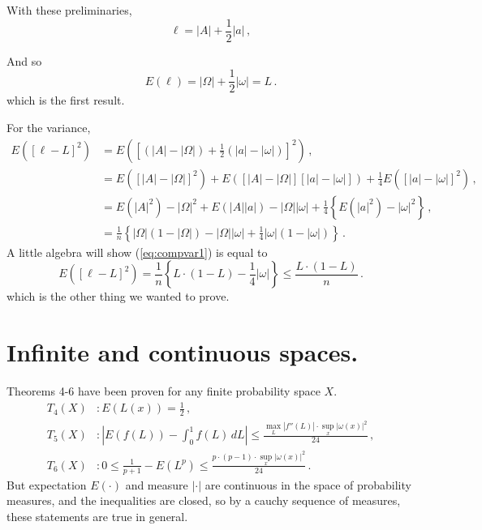 With these preliminaries,
\begin{equation}
\ell = |A| + \frac{1}{2} |a| \,,
\end{equation}

And so
\begin{equation*}
E(\ell)=|\Omega| + \frac{1}{2} |\omega| = L \,.
\end{equation*}
which is the first result.

For the variance,
\begin{align}
E([\ell-L]^2) &= E(\left[(|A|-|\Omega|) + \frac{1}{2}(|a|-|\omega|)\right]^2)  \,, \\
              &= E([|A|-|\Omega|]^2) + E([|A|-|\Omega|][|a|-|\omega|]) + \frac{1}{4} E([|a|-|\omega|]^2) \,, \\
              &= E(|A|^2)-|\Omega|^2 + E(|A||a|)-|\Omega||\omega| + \frac{1}{4} \left\{ E(|a|^2) - |\omega|^2 \right\} \,, \\
\label{eq:compvar1}
              &= \frac{1}{n} \left\{ |\Omega|(1-|\Omega|) -|\Omega||\omega| + \frac{1}{4}|\omega|(1-|\omega|) \right\} \,.
\end{align}
A little algebra will show (\ref{eq:compvar1}) is equal to
\begin{equation}
E([\ell-L]^2) = \frac{1}{n} \left\{ L \cdot (1-L) - \frac{1}{4} |\omega| \right \} \leq \frac{L \cdot (1-L)}{n} \,.
\end{equation}
which is the other thing we wanted to prove.

\section{Infinite and continuous spaces.}
Theorems 4-6 have been proven for any finite probability space $X$.  
\begin{align}
T_4(X)&: E(L(x))=\frac{1}{2} \,, \\
T_5(X)&: \left|E(f(L))-\int_0^1 f(L) \, dL \right| \leq \frac{\max_L |f''(L)| \cdot \sup_x |\omega(x)|^2}{24} \,, \\
T_6(X)&: 0 \leq \frac{1}{p+1}-E(L^p) \leq \frac{p\cdot(p-1)\cdot \sup_x |\omega(x)|^2}{24} \,.
\end{align}
But expectation $E(\cdot)$ and measure $|\cdot|$ are continuous in the space of probability measures, and the inequalities are closed, so by a cauchy sequence of measures, these statements are true in general.

